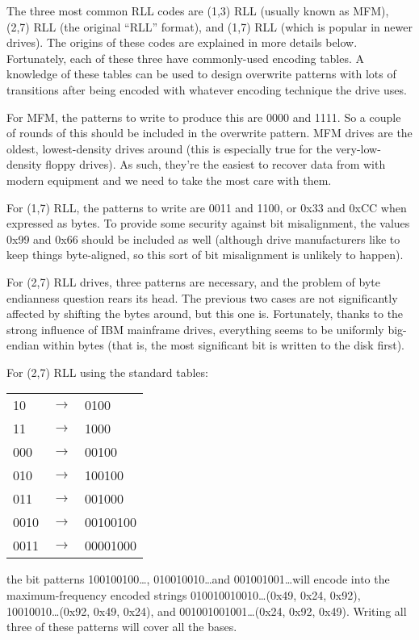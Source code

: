 The three most common RLL codes are (1,3) RLL (usually known as MFM), (2,7) RLL
(the original ``RLL'' format), and (1,7) RLL (which is popular in newer drives).
The origins of these codes are explained in more details below.  Fortunately,
each of these three have commonly-used encoding tables.  A knowledge of these
tables can be used to design overwrite patterns with lots of transitions after
being encoded with whatever encoding technique the drive uses.

For MFM, the patterns to write to produce this are 0000 and 1111.  So a couple
of rounds of this should be included in the overwrite pattern. MFM drives are
the oldest, lowest-density drives around (this is especially true for the
very-low-density floppy drives).  As such, they're the easiest to recover data
from with modern equipment and we need to take the most care with them.

For (1,7) RLL, the patterns to write are 0011 and 1100, or 0x33 and 0xCC when
expressed as bytes.  To provide some security against bit misalignment, the
values 0x99 and 0x66 should be included as well (although drive manufacturers
like to keep things byte-aligned, so this sort of bit misalignment is unlikely
to happen).

For (2,7) RLL drives, three patterns are necessary, and the problem of byte
endianness question rears its head.  The previous two cases are not
significantly affected by shifting the bytes around, but this one is.
Fortunately, thanks to the strong influence of IBM mainframe drives, everything
seems to be uniformly big-endian within bytes (that is, the most significant
bit is written to the disk first).

For (2,7) RLL using the standard tables:

\begin{center}
\begin{tabular}{l c l}
  10   & $\rightarrow$ & 0100\\
  11   & $\rightarrow$ & 1000\\
  000  & $\rightarrow$ & 00100\\
  010  & $\rightarrow$ & 100100\\
  011  & $\rightarrow$ & 001000\\
  0010 & $\rightarrow$ & 00100100\\
  0011 & $\rightarrow$ & 00001000\\
\end{tabular}
\end{center}

the bit patterns 100100100\dots, 010010010\dots and 001001001\dots will encode into
the maximum-frequency encoded strings 010010010010\dots (0x49, 0x24, 0x92),
10010010\dots (0x92, 0x49, 0x24), and 001001001001\dots (0x24, 0x92, 0x49).
Writing all three of these patterns will cover all the bases.

